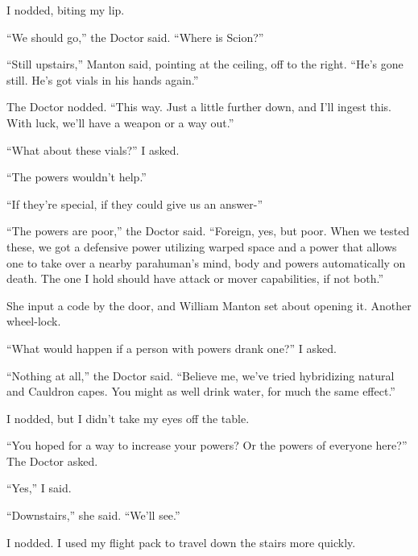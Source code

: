 I nodded, biting my lip.



``We should go,'' the Doctor said.  ``Where is Scion?''



``Still upstairs,'' Manton said, pointing at the ceiling, off to the right.  ``He's gone still.  He's got vials in his hands again.''



The Doctor nodded.  ``This way.  Just a little further down, and I'll ingest this.  With luck, we'll have a weapon or a way out.''



``What about these vials?''  I asked.



``The powers wouldn't help.''



``If they're special, if they could give us an answer-''



``The powers are poor,'' the Doctor said.  ``Foreign, yes, but poor.  When we tested these, we got a defensive power utilizing warped space and a power that allows one to take over a nearby parahuman's mind, body and powers automatically on death.  The one I hold should have attack or mover capabilities, if not both.''



She input a code by the door, and William Manton set about opening it.  Another wheel-lock.



``What would happen if a person with powers drank one?''  I asked.



``Nothing at all,'' the Doctor said.  ``Believe me, we've tried hybridizing natural and Cauldron capes.  You might as well drink water, for much the same effect.''



I nodded, but I didn't take my eyes off the table.



``You hoped for a way to increase your powers?  Or the powers of everyone here?''  The Doctor asked.



``Yes,'' I said.



``Downstairs,'' she said.  ``We'll see.''



I nodded.  I used my flight pack to travel down the stairs more quickly.



